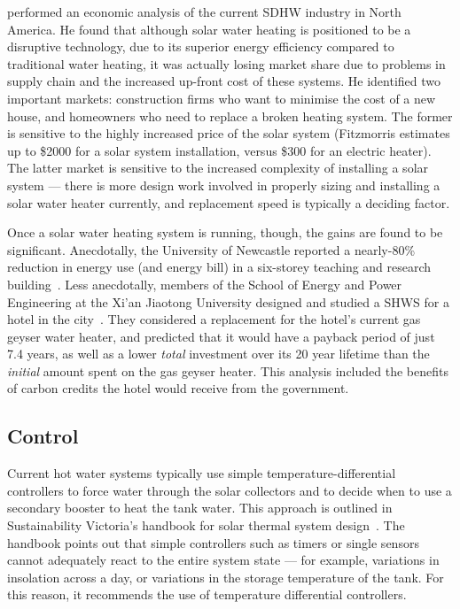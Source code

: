 \textcite{Fitzmorris10} performed an economic analysis of the current SDHW industry in North America.
He found that although solar water heating is positioned to be a disruptive technology, due to its superior energy efficiency compared to traditional water heating, it was actually losing market share due to problems in supply chain and the increased up-front cost of these systems.
He identified two important markets: construction firms who want to minimise the cost of a new house, and homeowners who need to replace a broken heating system.
The former is sensitive to the highly increased price of the solar system (Fitzmorris estimates up to \$2000 for a solar system installation, versus \$300 for an electric heater).
The latter market is sensitive to the increased complexity of installing a solar system --- there is more design work involved in properly sizing and installing a solar water heater currently, and replacement speed is typically a deciding factor.

Once a solar water heating system is running, though, the gains are found to be significant.
Anecdotally, the University of Newcastle reported a nearly-80\% reduction in energy use (and energy bill) in a six-storey teaching and research building~\cite{ApricusNewcastle}.
Less anecdotally, members of the School of Energy and Power Engineering at the Xi'an Jiaotong University designed and studied a SHWS for a hotel in the city~\cite{Cao14}.
They considered a replacement for the hotel's current gas geyser water heater, and predicted that it would have a payback period of just 7.4 years, as well as a lower \emph{total} investment over its 20 year lifetime than the \emph{initial} amount spent on the gas geyser heater.
This analysis included the benefits of carbon credits the hotel would receive from the government.


\subsection{Control}

Current hot water systems typically use simple temperature-differential controllers to force water through the solar collectors and to decide when to use a secondary booster to heat the tank water.
This approach is outlined in Sustainability Victoria's handbook for solar thermal system design~\cite{LSTS}.
The handbook points out that simple controllers such as timers or single sensors cannot adequately react to the entire system state --- for example, variations in insolation across a day, or variations in the storage temperature of the tank.
For this reason, it recommends the use of temperature differential controllers.

